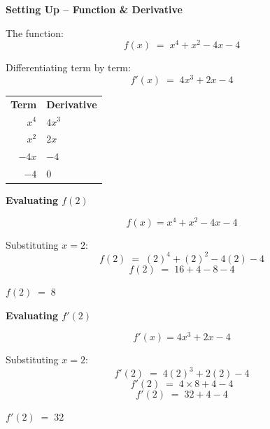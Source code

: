 \documentclass[12pt]{beamer}
\begin{document}
\begin{frame}{\textbf{Setting Up \;--\; Function \& Derivative}}
  \begin{center}
    \vfill

    The function:
    \[
      f(x) \;=\; x^4 + x^2 - 4x - 4
    \]

    \vspace{0.8em}
    Differentiating term by term:
    \[
      f'(x) \;=\; 4x^3 + 2x - 4
    \]

    \vspace{1.2em}
    \renewcommand{\arraystretch}{1.3}
    \begin{tabular}{r@{\qquad}l}
      \textbf{Term} & \textbf{Derivative} \\
      $x^4$         & $4x^3$ \\
      $x^2$         & $2x$   \\
      $-4x$         & $-4$   \\
      $-4$          & $0$    \\
    \end{tabular}

    \vfill
  \end{center}
\end{frame}

\begin{frame}{\textbf{Evaluating $f(2)$}}
  \begin{center}
    \vfill

    \[
      f(x) = x^4 + x^2 - 4x - 4
    \]

    \vspace{0.6em}
    Substituting $x = 2$:
    \[
      f(2) \;=\; (2)^4 + (2)^2 - 4(2) - 4
    \]
    \[
      f(2) \;=\; 16 + 4 - 8 - 4
    \]

    \vspace{0.8em}
    \LARGE\textbf{\textcolor{madblue}{$f(2) \;=\; 8$}}

    \vfill
  \end{center}
\end{frame}

\begin{frame}{\textbf{Evaluating $f'(2)$}}
  \begin{center}
    \vfill

    \[
      f'(x) = 4x^3 + 2x - 4
    \]

    \vspace{0.6em}
    Substituting $x = 2$:
    \[
      f'(2) \;=\; 4(2)^3 + 2(2) - 4
    \]
    \[
      f'(2) \;=\; 4 \times 8 + 4 - 4
    \]
    \[
      f'(2) \;=\; 32 + 4 - 4
    \]

    \vspace{0.8em}
    \textbf{\textcolor{madblue}{$f'(2) \;=\; 32$}}

    \vfill
  \end{center}
\end{frame}
\end{document}
